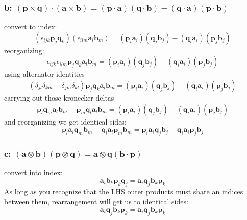 \subsubsection*{b: $(\bm{p} \times \bm{q}) \cdot (\bm{a} \times \bm{b}) = (\bm{p} \cdot \bm{a}) (\bm{q} \cdot \bm{b}) - (\bm{q} \cdot \bm{a})(\bm{p} \cdot \bm{b})$}
convert to index:
\begin{equation}
    (\epsilon_{ijk}\bm{p}_j\bm{q}_k)(\epsilon_{ilm}\bm{a}_l\bm{b}_m) = (\bm{p}_i\bm{a}_i) (\bm{q}_j\bm{b}_j) - (\bm{q}_i\bm{a}_i)(\bm{p}_j\bm{b}_j)
\end{equation}
reorganizing:
\begin{equation}
    \epsilon_{ijk}\epsilon_{ilm}\bm{p}_j\bm{q}_k\bm{a}_l\bm{b}_m = (\bm{p}_i\bm{a}_i) (\bm{q}_j\bm{b}_j) - (\bm{q}_i\bm{a}_i)(\bm{p}_j\bm{b}_j)
\end{equation}
using alternator identities
\begin{equation}
    (\delta_{jl}\delta_{km}-\delta_{jm}\delta_{kl})\bm{p}_j\bm{q}_k\bm{a}_l\bm{b}_m= (\bm{p}_i\bm{a}_i) (\bm{q}_j\bm{b}_j) - (\bm{q}_i\bm{a}_i)(\bm{p}_j\bm{b}_j)
\end{equation}
carrying out those kronecker deltas
\begin{equation}
    \bm{p}_l\bm{q}_m\bm{a}_l\bm{b}_m-\bm{p}_m\bm{q}_l\bm{a}_l\bm{b}_m= (\bm{p}_i\bm{a}_i) (\bm{q}_j\bm{b}_j) - (\bm{q}_i\bm{a}_i)(\bm{p}_j\bm{b}_j)
\end{equation}
and reorganizing we get identical sides:
\begin{equation}
   \boxed{ \bm{p}_l\bm{a}_l\bm{q}_m\bm{b}_m-\bm{q}_l\bm{a}_l\bm{p}_m\bm{b}_m= \bm{p}_i\bm{a}_i\bm{q}_j\bm{b}_j - \bm{q}_i\bm{a}_i\bm{p}_j\bm{b}_j}
\end{equation}



\subsubsection*{c: $(\bm{a} \otimes \bm{b})(\bm{p} \otimes \bm{q}) = \bm{a}\otimes\bm{q}(\bm{b} \cdot \bm{p}) $}
convert into index:
\begin{equation}
    \bm{a}_i\bm{b}_k\bm{p}_k \bm{q}_j = \bm{a}_i\bm{q}_j\bm{b}_k\bm{p}_k
\end{equation}
As long as you recognize that the LHS outer products must share an indices between them, rearrangement will get us to identical sides:
\begin{equation}
   \boxed{ \bm{a}_i\bm{q}_j\bm{b}_k\bm{p}_k  = \bm{a}_i\bm{q}_j\bm{b}_k\bm{p}_k}
\end{equation}



